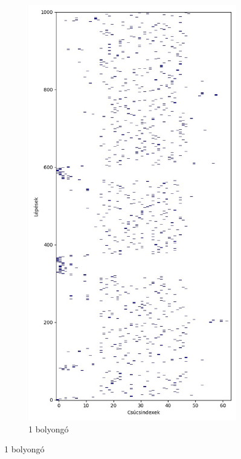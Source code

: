 \begin{figure}[H]
  \centering
  \begin{subfigure}{.45\linewidth}
    \centering
    \includegraphics[width=\linewidth]{./figures/ragasztott_binaris/sim00.jpg}
    \caption{1 bolyongó}

\end{subfigure}
\end{figure}
